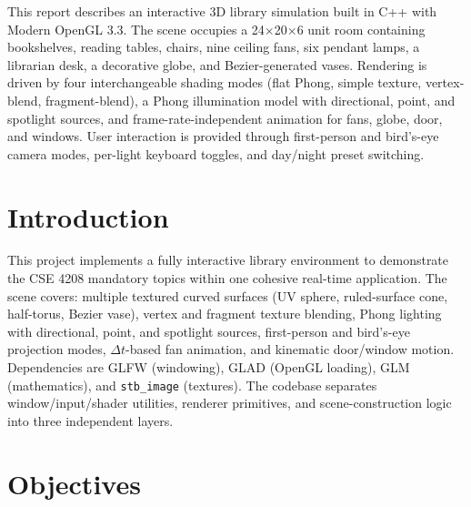 \documentclass[12pt, a4paper]{article}
\begin{document}
This report describes an interactive 3D library simulation built in C++ with Modern OpenGL 3.3.
The scene occupies a 24$\times$20$\times$6 unit room containing bookshelves, reading tables, chairs, nine ceiling fans, six pendant lamps, a librarian desk, a decorative globe, and Bezier-generated vases.
Rendering is driven by four interchangeable shading modes (flat Phong, simple texture, vertex-blend, fragment-blend), a Phong illumination model with directional, point, and spotlight sources, and frame-rate-independent animation for fans, globe, door, and windows.
User interaction is provided through first-person and bird's-eye camera modes, per-light keyboard toggles, and day/night preset switching.

\section{Introduction}

This project implements a fully interactive library environment to demonstrate the CSE 4208 mandatory topics within one cohesive real-time application.
The scene covers: multiple textured curved surfaces (UV sphere, ruled-surface cone, half-torus, Bezier vase), vertex and fragment texture blending, Phong lighting with directional, point, and spotlight sources, first-person and bird's-eye projection modes, $\Delta t$-based fan animation, and kinematic door/window motion.
Dependencies are GLFW (windowing), GLAD (OpenGL loading), GLM (mathematics), and \texttt{stb\_image} (textures).
The codebase separates window/input/shader utilities, renderer primitives, and scene-construction logic into three independent layers.

\section{Objectives}
\end{document}
